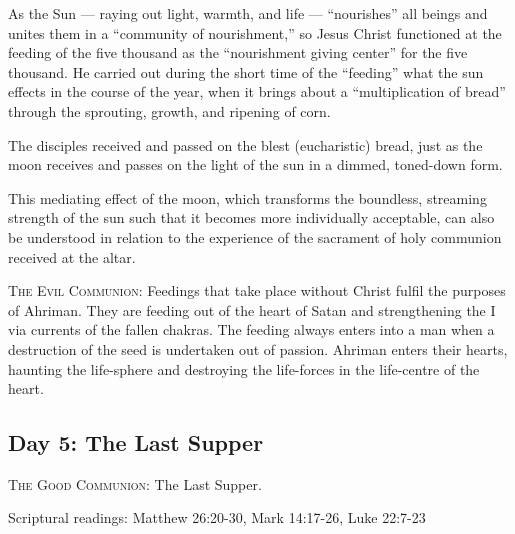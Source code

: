 As the Sun — raying out light, warmth, and life — “nourishes” all beings and
unites them in a “community of nourishment,” so Jesus Christ functioned at the feeding of the five thousand as the
“nourishment giving center” for the five thousand. He carried out during the short time of the “feeding” what the sun
effects in the course of the year, when it brings about a “multiplication of bread” through the sprouting, growth, and
ripening of corn.

The disciples received and passed on the blest (eucharistic) bread, just as the moon receives and passes on the light of
the sun in a dimmed, toned-down form.

This mediating effect of the moon, which transforms the boundless, streaming strength of the sun such that it becomes
more individually acceptable, can also be understood in relation to the experience of the sacrament of holy communion
received at the altar.

\textsc{The Evil Communion}:
Feedings that take place without Christ fulfil the purposes of Ahriman. They are feeding out of the heart of Satan and
strengthening the I via currents of the fallen chakras. The feeding always enters into a man when a destruction of the
seed is undertaken out of passion. Ahriman enters their hearts, haunting the life-sphere and destroying the life-forces
in the life-centre of the heart.

\subsection*{Day 5: The Last Supper}
\textsc{The Good Communion}: The Last Supper.

Scriptural readings: Matthew 26:20-30, Mark 14:17-26, Luke 22:7-23

